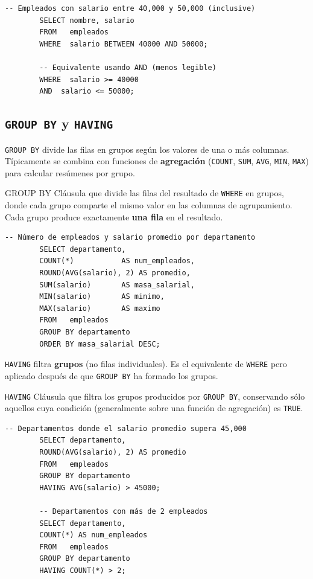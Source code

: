 \documentclass[12pt, a4paper]{article}
\begin{document}
	\begin{lstlisting}[caption={BETWEEN para rangos.}]
		-- Empleados con salario entre 40,000 y 50,000 (inclusive)
		SELECT nombre, salario
		FROM   empleados
		WHERE  salario BETWEEN 40000 AND 50000;
		
		-- Equivalente usando AND (menos legible)
		WHERE  salario >= 40000
		AND  salario <= 50000;
	\end{lstlisting}
	
	\subsection{\texttt{GROUP BY} y \texttt{HAVING}}
	
	\texttt{GROUP BY} divide las filas en grupos según los valores
	de una o más columnas. Típicamente se combina con funciones de
	\textbf{agregación} (\texttt{COUNT}, \texttt{SUM}, \texttt{AVG},
	\texttt{MIN}, \texttt{MAX}) para calcular resúmenes por grupo.
	
	\begin{definicion}{GROUP BY}
		Cláusula que divide las filas del resultado de \texttt{WHERE} en
		grupos, donde cada grupo comparte el mismo valor en las columnas
		de agrupamiento.
		Cada grupo produce exactamente \textbf{una fila} en el resultado.
	\end{definicion}
	
	\begin{lstlisting}[caption={GROUP BY con funciones de agregación.}]
		-- Número de empleados y salario promedio por departamento
		SELECT departamento,
		COUNT(*)           AS num_empleados,
		ROUND(AVG(salario), 2) AS promedio,
		SUM(salario)       AS masa_salarial,
		MIN(salario)       AS minimo,
		MAX(salario)       AS maximo
		FROM   empleados
		GROUP BY departamento
		ORDER BY masa_salarial DESC;
	\end{lstlisting}
	
	\texttt{HAVING} filtra \textbf{grupos} (no filas individuales).
	Es el equivalente de \texttt{WHERE} pero aplicado después de que
	\texttt{GROUP BY} ha formado los grupos.
	
	\begin{definicion}{\texttt{HAVING}}
		Cláusula que filtra los grupos producidos por \texttt{GROUP BY},
		conservando sólo aquellos cuya condición (generalmente sobre
		una función de agregación) es \texttt{TRUE}.
	\end{definicion}
	
	\begin{lstlisting}[caption={HAVING: filtrar grupos por condición agregada.}]
		-- Departamentos donde el salario promedio supera 45,000
		SELECT departamento,
		ROUND(AVG(salario), 2) AS promedio
		FROM   empleados
		GROUP BY departamento
		HAVING AVG(salario) > 45000;
		
		-- Departamentos con más de 2 empleados
		SELECT departamento,
		COUNT(*) AS num_empleados
		FROM   empleados
		GROUP BY departamento
		HAVING COUNT(*) > 2;
	\end{lstlisting}
	
\end{document}
